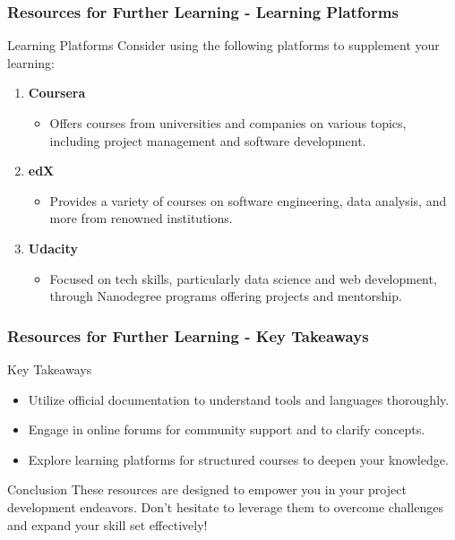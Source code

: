\documentclass[aspectratio=169]{beamer}
\begin{document}
\begin{frame}[fragile]
  \frametitle{Resources for Further Learning - Learning Platforms}
  \begin{block}{Learning Platforms}
    Consider using the following platforms to supplement your learning:
  \end{block}
  
  \begin{enumerate}
    \item \textbf{Coursera}
      \begin{itemize}
        \item Offers courses from universities and companies on various topics, including project management and software development.
      \end{itemize}
  
    \item \textbf{edX}
      \begin{itemize}
        \item Provides a variety of courses on software engineering, data analysis, and more from renowned institutions.
      \end{itemize}

    \item \textbf{Udacity}
      \begin{itemize}
        \item Focused on tech skills, particularly data science and web development, through Nanodegree programs offering projects and mentorship.
      \end{itemize}
  \end{enumerate}
\end{frame}

\begin{frame}[fragile]
  \frametitle{Resources for Further Learning - Key Takeaways}
  \begin{block}{Key Takeaways}
    \begin{itemize}
      \item Utilize official documentation to understand tools and languages thoroughly.
      \item Engage in online forums for community support and to clarify concepts.
      \item Explore learning platforms for structured courses to deepen your knowledge.
    \end{itemize}
  \end{block}
  
  \begin{block}{Conclusion}
    These resources are designed to empower you in your project development endeavors. Don't hesitate to leverage them to overcome challenges and expand your skill set effectively!
  \end{block}
\end{frame}
\end{document}
